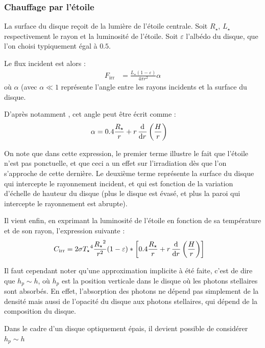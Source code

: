 \subsubsection{Chauffage par l'étoile}
La surface du disque reçoit de la lumière de l'étoile centrale. Soit $R_\star$, $L_\star$ respectivement le rayon et la luminosité de l'étoile. Soit $\varepsilon$ l'albédo du disque, que l'on choisi typiquement égal à $0.5$. 

Le flux incident est alors \citep[eq. (7)]{menou2004low} : 
\begin{align}
F_\text{irr} &= \frac{L_\star(1-\varepsilon)}{4\pi r^2} \alpha
\end{align}
où $\alpha$ (avec $\alpha\ll 1$ représente l'angle entre les rayons incidents et la surface du disque. 

D'après notamment \cite[eq. (5)]{chiang1997spectral}, cet angle peut être écrit comme : 
\begin{align}
\alpha &= 0.4 \frac{R_\star}{r} + r \mathinner{ \dfrac{\operatorname{d \!}{^{}}}{\operatorname{d \!}{{r}^{}}} }\left(\frac{H}{r}\right)
\end{align}

On note que dans cette expression, le premier terme illustre le fait que l'étoile n'est pas ponctuelle, et que ceci a un effet sur l'irradiation dès que l'on s'approche de cette dernière. Le deuxième terme représente la surface du disque qui intercepte le rayonnement incident, et qui est fonction de la variation d'échelle de hauteur du disque (plus le disque est évasé, et plus la paroi qui intercepte le rayonnement est abrupte). 

Il vient enfin, en exprimant la luminosité de l'étoile en fonction de sa température et de son rayon, l'expression suivante :
\begin{align}
C_\text{irr} &= 2 \sigma {T_\star}^4 \frac{{R_\star}^2}{r^2} (1-\varepsilon) * \left[0.4 \frac{R_\star}{r} + r \mathinner{ \dfrac{\operatorname{d \!}{^{}}}{\operatorname{d \!}{{r}^{}}} }\left(\frac{H}{r}\right)\right]
\end{align}

\begin{remarque}
Il faut cependant noter qu'une approximation implicite à été faite, c'est de dire que $h_p\sim h$, où $h_p$ est la position verticale dans le disque où les photons stellaires sont absorbés. En effet, l'absorption des photons ne dépend pas simplement de la densité mais aussi de l'opacité du disque aux photons stellaires, qui dépend de la composition du disque.

Dans le cadre d'un disque optiquement épais, il devient possible de considérer $h_p \sim h$
\end{remarque}

